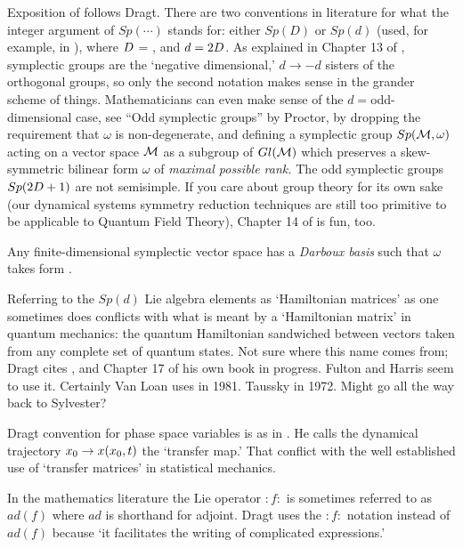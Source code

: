 Exposition of  follows Dragt.
There are two conventions in literature for what the integer argument of
$Sp(\cdots)$ stands for: either $Sp(D)$ or $Sp(d)$ (used, for example, in
), where $D$ = \dof, and $d=2D$. As explained
in Chapter 13 of , symplectic groups are the `negative
dimensional,' $d \to -d$ sisters of the orthogonal groups, so only the
second notation makes sense in the grander scheme of things.
Mathematicians can even make sense of the $d= $odd-dimensional case,
see ``Odd symplectic groups'' by Proctor, by dropping
the requirement that $\omega$ is non-degenerate, and defining
a symplectic group $Sp({\cal M},\omega)$ acting on a vector space ${\cal M}$
as a subgroup of $Gl({\cal M})$ which preserves a skew-symmetric bilinear form
$\omega$ of \emph{maximal possible rank.} The odd symplectic groups
$Sp(2D+1)$ are not semisimple.
If
you care about group theory for its own sake (our dynamical systems
symmetry reduction techniques are still too primitive to be applicable to
Quantum Field Theory), Chapter 14  of  is fun, too.

Any finite-dimensional symplectic vector space has a \emph{Darboux basis}
such that $\omega$ takes form .

Referring to the $Sp(d)$ Lie algebra elements as  `Hamiltonian matrices'
as one sometimes does conflicts with
what is meant by a `Hamiltonian matrix' in quantum mechanics: the quantum
Hamiltonian sandwiched between vectors taken from any complete set of
quantum states. Not sure where this name comes from; Dragt cites
, and  Chapter 17 of his own book in
progress. %
Fulton and Harris seem to use it. Certainly Van
Loan uses in 1981. Taussky in 1972. Might go all the way back
to Sylvester?

Dragt convention for phase space variables is as in
. He calls the dynamical trajectory ${x_0} \to
x({x_0},t)$ the `transfer map.' That conflict with the well
established use of `transfer matrices' in statistical mechanics.

In the mathematics literature the Lie operator $:f:$ is sometimes
referred to as $ad(f)$ where $ad$ is shorthand for adjoint. Dragt uses the
$:f:$ notation instead of $ad(f)$ because `it facilitates the writing of
complicated expressions.'

